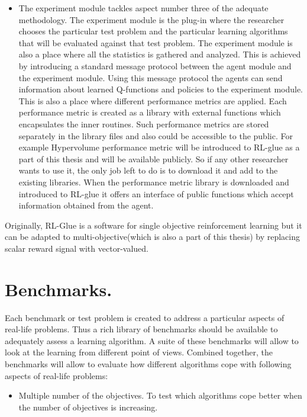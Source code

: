 {{\begin{itemize}
\item The experiment module tackles aspect number three of the adequate methodology. The experiment module is the plug-in where the researcher chooses the particular test problem and the particular learning algorithms that will be evaluated against that test problem. The experiment module is also a place where all the statistics is gathered and analyzed. This is achieved by introducing a standard message protocol between the agent module and the experiment module. Using this message protocol the agents can send information about learned Q-functions and policies to the experiment module. This is also a place where different performance metrics are applied. Each performance metric is created as a library with external functions which encapsulates the inner routines. Such performance metrics are stored separately in the library files and also could be accessible to the public. For example Hypervolume performance metric will be introduced to RL-glue as a part of this thesis and will be available publicly. So if any other researcher wants to use it, the only job left to do is to download it and add to the existing libraries. When the performance metric library is downloaded and introduced to RL-glue it offers an interface of public functions which accept information obtained from the agent.

\end{itemize}

Originally, RL-Glue is a software for single objective reinforcement learning but it can be adapted to multi-objective(which is also a part of this thesis) by replacing scalar reward signal with vector-valued. \\

\section{Benchmarks.}

Each benchmark or test problem is created to address a particular aspects of real-life problems. Thus a rich library of benchmarks should be available to adequately assess a learning algorithm. A suite of these benchmarks will allow to look at the learning from different point of views. Combined together, the benchmarks will allow to evaluate how different algorithms cope with following aspects of real-life problems:

\begin{itemize}

\item Multiple number of the objectives. To test which algorithms cope better when the number of objectives is increasing.


\end{itemize}}}
